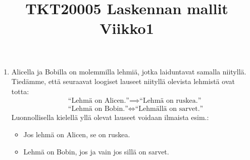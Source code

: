 \documentclass[12pt,a4paper]{article}
\title{TKT20005 Laskennan mallit Viikko1}
\date{}
\begin{document}
\maketitle

\begin{enumerate}
  \item Alicella ja Bobilla on molemmilla lehmiä, jotka laiduntavat samalla niityllä. Tiedämme, että seuraavat loogiset lauseet niityllä olevista lehmistä ovat totta:
    \begin{align*}
      &\textrm{``Lehmä on Alicen.''} \implies \textrm{``Lehmä on ruskea.''}\\
      &\textrm{``Lehmä on Bobin.''} \iff \textrm{``Lehmällä on sarvet.''}
    \end{align*}
    Luonnollisella kielellä yllä olevat lauseet voidaan ilmaista esim.:
    \begin{itemize}
        \item Jos lehmä on Alicen, se on ruskea.
        \item Lehmä on Bobin, jos ja vain jos sillä on sarvet.
    \end{itemize}
\end{enumerate}
\end{document}
